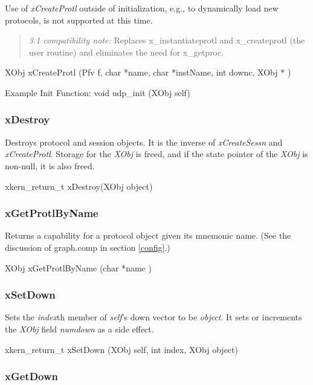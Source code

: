 Use of {\em xCreateProtl} outside of initialization, e.g., to
dynamically load new protocols, is not supported at this time.

\begin{quote}
{\em 3.1 compatibility note:} Replaces x\_instantiateprotl and
x\_createprotl (the user routine) and eliminates the need for x\_getproc.
\end{quote}
\medskip

{\sem XObj} {\bold xCreateProtl} ({\sem Pfv} {\caps f}, {\sem char} *{\caps name}, {\sem char} *{\caps instName}, {\sem int} {\caps downc}, {\sem XObj} *{} )
\medskip

{\sanss Example Init Function:} {\sem void} {\bold udp\_init} ({\sem XObj} {\caps self})

\subsubsection{xDestroy}

Destroys protocol and session objects. It is the inverse of {\em
xCreateSessn} and {\em xCreateProtl}.  Storage for the {\em XObj} is
freed, and if the state pointer of the {\em XObj} is non-null, it is
also freed.
\medskip

{\sem xkern\_return\_t} {\bold xDestroy}({\sem XObj} {\caps object})
\medskip

\subsubsection{xGetProtlByName}

Returns a capability for a protocol object given its mnemonic name.
(See the discussion of graph.comp in section \ref{config}.)
\medskip

{\sem XObj} {\bold xGetProtlByName} ({\sem char} *{\caps name} )

\subsubsection{xSetDown}

Sets the {\em index}th member of {\em self}'s down vector to be {\em
object}.  It sets or increments the {\em XObj} field {\em numdown} as
a side effect.
\medskip

{\sem xkern\_return\_t} {\bold xSetDown} ({\sem XObj} {\caps self}, {\sem int} {\caps index}, {\sem XObj} {\caps object})

\subsubsection{xGetDown}

